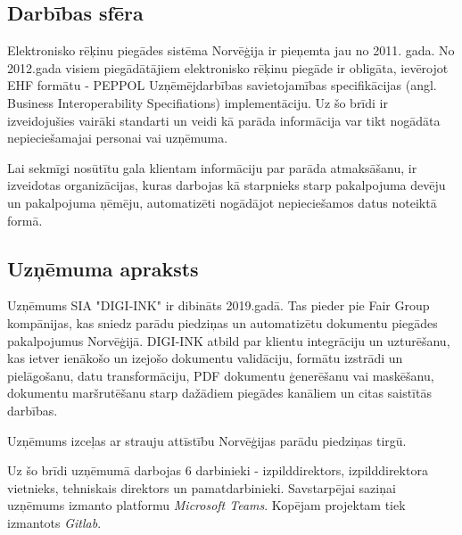 
\subsection{Darbības sfēra}
Elektronisko rēķinu piegādes sistēma Norvēģija ir pieņemta jau no 2011. gada. No 2012.gada visiem piegādātājiem elektronisko rēķinu piegāde ir obligāta, ievērojot EHF formātu - PEPPOL Uzņēmējdarbības savietojamības specifikācijas (angl. Business Interoperability Specifiations) implementāciju. Uz šo brīdi ir izveidojušies vairāki standarti un veidi kā parāda informācija var tikt nogādāta nepieciešamajai personai vai uzņēmuma.
\par Lai sekmīgi nosūtītu gala klientam informāciju par parāda atmaksāšanu, ir izveidotas organizācijas, kuras darbojas kā starpnieks starp pakalpojuma devēju un pakalpojuma ņēmēju, automatizēti nogādājot nepieciešamos datus noteiktā formā.
\subsection{Uzņēmuma apraksts}
Uzņēmums SIA "DIGI-INK" ir dibināts 2019.gadā. Tas pieder pie Fair Group kompānijas, kas sniedz parādu piedziņas un automatizētu dokumentu piegādes pakalpojumus Norvēģijā.
DIGI-INK atbild par klientu integrāciju un uzturēšanu, kas ietver ienākošo un izejošo dokumentu validāciju, formātu izstrādi un pielāgošanu, datu transformāciju, PDF dokumentu ģenerēšanu vai maskēšanu, dokumentu maršrutēšanu starp dažādiem piegādes kanāliem un citas saistītās darbības.
\par Uzņēmums izceļas ar strauju attīstību Norvēģijas parādu piedziņas tirgū. %
\par Uz šo brīdi uzņēmumā darbojas 6 darbinieki - izpilddirektors, izpilddirektora vietnieks, tehniskais direktors un pamatdarbinieki. Savstarpējai saziņai uzņēmums izmanto platformu \textit{Microsoft Teams}. Kopējam projektam tiek izmantots \textit{Gitlab}.
